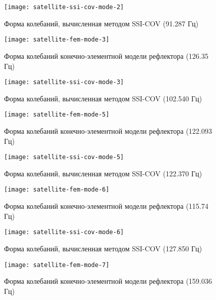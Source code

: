 \begin{figure}[H]
	\centerfloat
	\texttt{[image: satellite-ssi-cov-mode-2]}
	\caption{Форма колебаний, вычисленная методом SSI-COV (91.287 Гц)} \label{satellite-ssi-cov-mode-2}
\end{figure}

\begin{figure}[H]
	\centerfloat
	\texttt{[image: satellite-fem-mode-3]}
	\caption{Форма колебаний конечно-элементной модели рефлектора (126.35 Гц)} \label{satellite-fem-mode-3}
\end{figure}

\begin{figure}[H]
	\centerfloat
	\texttt{[image: satellite-ssi-cov-mode-3]}
	\caption{Форма колебаний, вычисленная методом SSI-COV (102.540 Гц)} \label{satellite-ssi-cov-mode-3}
\end{figure}

\begin{figure}[H]
	\centerfloat
	\texttt{[image: satellite-fem-mode-5]}
	\caption{Форма колебаний конечно-элементной модели рефлектора (122.093 Гц)} \label{satellite-fem-mode-5}
\end{figure}

\begin{figure}[H]
	\centerfloat
	\texttt{[image: satellite-ssi-cov-mode-5]}
	\caption{Форма колебаний, вычисленная методом SSI-COV (122.370 Гц)} \label{satellite-ssi-cov-mode-5}
\end{figure}

\begin{figure}[H]
	\centerfloat
	\texttt{[image: satellite-fem-mode-6]}
	\caption{Форма колебаний конечно-элементной модели рефлектора (115.74 Гц)} \label{satellite-fem-mode-6}
\end{figure}

\begin{figure}[H]
	\centerfloat
	\texttt{[image: satellite-ssi-cov-mode-6]}
	\caption{Форма колебаний, вычисленная методом SSI-COV (127.850 Гц)} \label{satellite-ssi-cov-mode-6}
\end{figure}

\begin{figure}[H]
	\centerfloat
	\texttt{[image: satellite-fem-mode-7]}
	\caption{Форма колебаний конечно-элементной модели рефлектора (159.036 Гц)} \label{satellite-fem-mode-7}
\end{figure}

